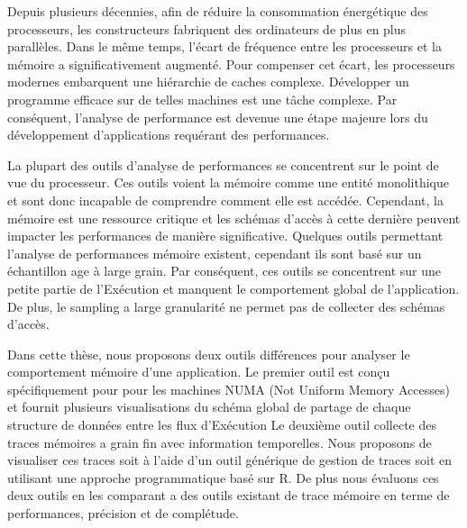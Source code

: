 
Depuis plusieurs décennies, afin de réduire la consommation énergétique des processeurs, les constructeurs fabriquent des ordinateurs de plus en plus parallèles.
Dans le même temps, l'écart de fréquence entre les processeurs et la mémoire a significativement augmenté.
Pour compenser cet écart, les processeurs modernes embarquent une hiérarchie de caches complexe.
Développer un programme efficace sur de telles machines est une t\^ache complexe.
Par conséquent, l'analyse de performance est devenue une étape majeure lors du développement d'applications requérant des performances.

La plupart des outils d'analyse de performances se concentrent sur le point de vue du processeur.
Ces outils voient la mémoire comme une entité monolithique et sont donc incapable de comprendre comment elle est accédée.
Cependant, la mémoire est une ressource critique et les schémas d'accès à cette dernière peuvent impacter les performances de manière significative.
Quelques outils permettant l'analyse de performances mémoire existent, cependant ils sont basé sur un échantillon age à large grain.
Par conséquent, ces outils se concentrent sur une petite partie de l’Exécution et manquent le comportement global de l'application.
De plus, le sampling a large granularité ne permet pas de collecter des schémas d'accès.

Dans cette thèse, nous proposons deux outils différences pour analyser le comportement mémoire d'une application.
Le premier outil est conçu spécifiquement pour pour les machines NUMA (Not Uniform Memory Accesses) et fournit plusieurs visualisations  du schéma global de partage de chaque structure de données entre les flux d’Exécution
Le deuxième outil collecte des traces mémoires a grain fin avec information temporelles.
Nous proposons de visualiser ces traces soit à l'aide d'un outil générique de gestion de traces soit en utilisant une approche programmatique basé sur R.
De plus nous évaluons ces deux outils en les comparant a des outils existant de trace mémoire en terme de performances, précision et de complétude.


